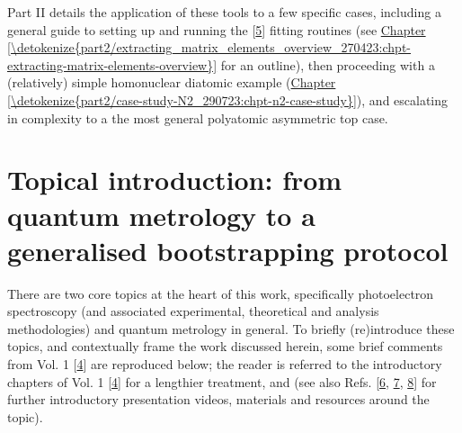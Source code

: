 \documentclass[letterpaper,table,10pt,english]{jupyterBook}
\begin{document}
\sphinxAtStartPar
Part II details the application of these tools to a few specific cases, including a general guide to setting up and running the  {[}\hyperlink{cite.backmatter/bibliography:id681}{5}{]} fitting routines (see \hyperref[\detokenize{part2/extracting_matrix_elements_overview_270423:chpt-extracting-matrix-elements-overview}]{Chapter \ref{\detokenize{part2/extracting_matrix_elements_overview_270423:chpt-extracting-matrix-elements-overview}}} for an outline), then proceeding with a (relatively) simple homonuclear diatomic example (\hyperref[\detokenize{part2/case-study-N2_290723:chpt-n2-case-study}]{Chapter \ref{\detokenize{part2/case-study-N2_290723:chpt-n2-case-study}}}), and escalating in complexity to a the most general polyatomic asymmetric top case.


\section{Topical introduction: from quantum metrology to a generalised bootstrapping protocol}
\label{\detokenize{part1/main_intro_060723:topical-introduction-from-quantum-metrology-to-a-generalised-bootstrapping-protocol}}\label{\detokenize{part1/main_intro_060723:sec-topical-intro}}
\sphinxAtStartPar
There are two core topics at the heart of this work, specifically photoelectron spectroscopy (and associated experimental, theoretical and analysis methodologies) and quantum metrology in general. To briefly (re)introduce these topics, and contextually frame the work discussed herein, some brief comments from  Vol. 1 {[}\hyperlink{cite.backmatter/bibliography:id676}{4}{]} are reproduced below; the reader is referred to the introductory chapters of  Vol. 1 {[}\hyperlink{cite.backmatter/bibliography:id676}{4}{]} for a lengthier treatment, and  (see also Refs. {[}\hyperlink{cite.backmatter/bibliography:id673}{6}, \hyperlink{cite.backmatter/bibliography:id675}{7}, \hyperlink{cite.backmatter/bibliography:id669}{8}{]} for further introductory presentation videos, materials and resources around the topic).
\end{document}
